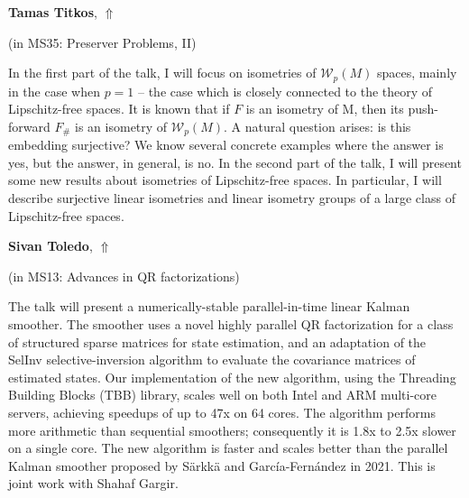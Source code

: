 \documentclass[ILAS2025-program.tex]{subfiles}
\begin{document}
\hypertarget{down0315}{}\begin{ilasabstract}
    
\textbf{Tamas Titkos},  \hfill \hyperlink{up0315}{$\Uparrow$}
    
    
(in {\color{mstitle}MS35: Preserver Problems, II})
        
\mtskip
    In the first part of the talk, I will focus on isometries of $\mathcal{W}_p(M)$ spaces, mainly in the case when $p=1$ -- the case which is closely connected to the theory of Lipschitz-free spaces. It is known that if $F$ is an isometry of M, then its push-forward $F_{\#}$ is an isometry of $\mathcal{W}_p(M)$. A natural question arises: is this embedding surjective? We know several concrete examples where the answer is yes, but the answer, in general, is no. In the second part of the talk, I will present some new results about isometries of Lipschitz-free spaces. In particular, I will describe surjective linear isometries and linear isometry groups of a large class of Lipschitz-free spaces.

\end{ilasabstract}
    

\hypertarget{down0342}{}\begin{ilasabstract}
    
\textbf{Sivan Toledo},  \hfill \hyperlink{up0342}{$\Uparrow$}
    
    
(in {\color{mstitle}MS13: Advances in QR factorizations})
        
\mtskip
    The talk will present a numerically-stable parallel-in-time linear 
Kalman smoother. The smoother uses a novel highly parallel
QR factorization for a class of structured sparse
matrices for state estimation, and an adaptation of the SelInv
selective-inversion algorithm to evaluate the covariance matrices
of estimated states. Our implementation of the new
algorithm, using the Threading Building Blocks (TBB) library,
scales well on both Intel and ARM multi-core servers, achieving
speedups of up to 47x on 64 cores. The algorithm performs
more arithmetic than sequential smoothers; consequently it is
1.8x to 2.5x slower on a single core. The new algorithm is faster
and scales better than the parallel Kalman smoother proposed
by Särkkä and García-Fernández in 2021.
This is joint work with Shahaf Gargir.

\end{ilasabstract}
    
\end{document}
